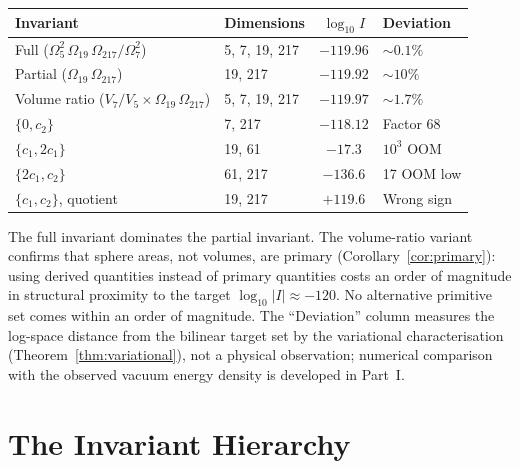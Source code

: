 \documentclass[11pt,a4paper]{article}
\begin{document}
\begin{center}
\begin{tabular}{llcl}
\toprule
Invariant & Dimensions & $\log_{10} I$ & Deviation \\
\midrule
Full ($\Omega_5^2\,\Omega_{19}\,\Omega_{217}/\Omega_7^2$)
& 5, 7, 19, 217 & $-119.96$ & $\sim 0.1\%$ \\
Partial ($\Omega_{19}\,\Omega_{217}$)
& 19, 217 & $-119.92$ & $\sim 10\%$ \\
Volume ratio ($V_7/V_5\times\Omega_{19}\,\Omega_{217}$)
& 5, 7, 19, 217 & $-119.97$ & $\sim 1.7\%$ \\
$\{0, c_2\}$ & 7, 217 & $-118.12$ & Factor 68 \\
$\{c_1, 2c_1\}$ & 19, 61 & $-17.3$ & $10^{3}$ OOM \\
$\{2c_1, c_2\}$ & 61, 217 & $-136.6$ & 17 OOM low \\
$\{c_1, c_2\}$, quotient & 19, 217 & $+119.6$ & Wrong sign \\
\bottomrule
\end{tabular}
\end{center}

The full invariant dominates the partial invariant. The volume-ratio
variant confirms that sphere areas, not volumes, are primary
(Corollary~\ref{cor:primary}): using derived quantities instead of
primary quantities costs an order of magnitude in structural proximity
to the target $\log_{10}|I|\approx -120$. No alternative primitive set
comes within an order of magnitude. The ``Deviation'' column measures
the log-space distance from the bilinear target set by the
variational characterisation (Theorem~\ref{thm:variational}), not a
physical observation; numerical comparison with the observed vacuum
energy density is developed in Part~I.

\section{The Invariant Hierarchy}\label{sec:the-invariant-hierarchy}
\end{document}
